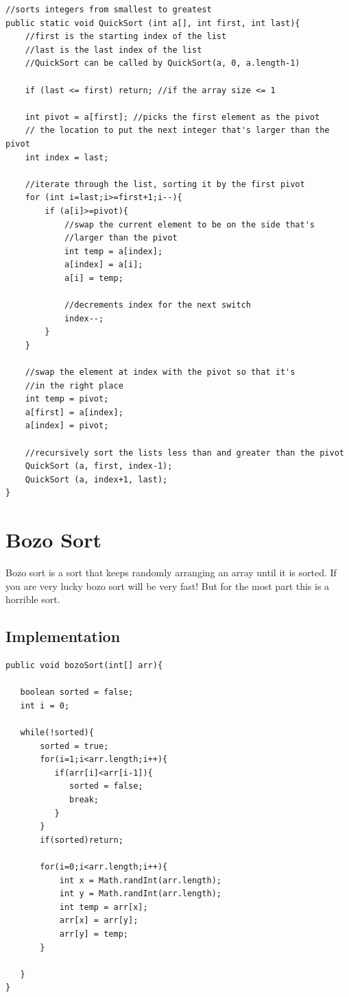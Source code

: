 \documentclass[11pt,oneside]{book}
\begin{document}
\begin{lstlisting}
//sorts integers from smallest to greatest
public static void QuickSort (int a[], int first, int last){
    //first is the starting index of the list
    //last is the last index of the list
    //QuickSort can be called by QuickSort(a, 0, a.length-1)
    
    if (last <= first) return; //if the array size <= 1
    
    int pivot = a[first]; //picks the first element as the pivot
    // the location to put the next integer that's larger than the pivot
    int index = last;  
    
    //iterate through the list, sorting it by the first pivot
    for (int i=last;i>=first+1;i--){
        if (a[i]>=pivot){
            //swap the current element to be on the side that's 
            //larger than the pivot
            int temp = a[index];
            a[index] = a[i];
            a[i] = temp;
            
            //decrements index for the next switch
            index--;
        }
    }
    
    //swap the element at index with the pivot so that it's 
    //in the right place
    int temp = pivot;
    a[first] = a[index];
    a[index] = pivot;
    
    //recursively sort the lists less than and greater than the pivot
    QuickSort (a, first, index-1);
    QuickSort (a, index+1, last);
}
\end{lstlisting}
\section{Bozo Sort}

Bozo sort is a sort that keeps randomly arranging an array until it is sorted. If you are very lucky bozo sort will be very fast! But for the most part this is a horrible sort.

\subsection{Implementation}

\begin{lstlisting}
public void bozoSort(int[] arr){
   
   boolean sorted = false;
   int i = 0;

   while(!sorted){
       sorted = true;
       for(i=1;i<arr.length;i++){
          if(arr[i]<arr[i-1]){
             sorted = false;
             break;
          }
       }
       if(sorted)return;

       for(i=0;i<arr.length;i++){
           int x = Math.randInt(arr.length);
           int y = Math.randInt(arr.length);
           int temp = arr[x];
           arr[x] = arr[y];
           arr[y] = temp;
       }

   }
}

\end{lstlisting}
\end{document}
